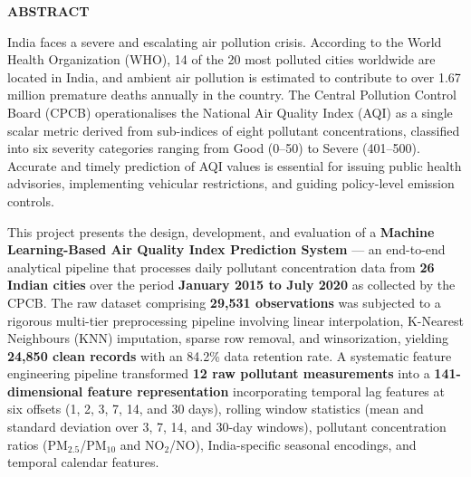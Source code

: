 \documentclass[12pt,a4paper]{report}
\begin{document}
\vspace*{0.5cm}

{\LARGE \textbf{ABSTRACT}}

\vspace{1cm}

India faces a severe and escalating air pollution crisis. According to the World Health Organization (WHO), 14 of the 20 most polluted cities worldwide are located in India, and ambient air pollution is estimated to contribute to over 1.67 million premature deaths annually in the country. The Central Pollution Control Board (CPCB) operationalises the National Air Quality Index (AQI) as a single scalar metric derived from sub-indices of eight pollutant concentrations, classified into six severity categories ranging from Good (0--50) to Severe (401--500). Accurate and timely prediction of AQI values is essential for issuing public health advisories, implementing vehicular restrictions, and guiding policy-level emission controls.

This project presents the design, development, and evaluation of a \textbf{Machine Learning-Based Air Quality Index Prediction System} --- an end-to-end analytical pipeline that processes daily pollutant concentration data from \textbf{26 Indian cities} over the period \textbf{January 2015 to July 2020} as collected by the CPCB. The raw dataset comprising \textbf{29,531 observations} was subjected to a rigorous multi-tier preprocessing pipeline involving linear interpolation, K-Nearest Neighbours (KNN) imputation, sparse row removal, and winsorization, yielding \textbf{24,850 clean records} with an 84.2\% data retention rate. A systematic feature engineering pipeline transformed \textbf{12 raw pollutant measurements} into a \textbf{141-dimensional feature representation} incorporating temporal lag features at six offsets (1, 2, 3, 7, 14, and 30 days), rolling window statistics (mean and standard deviation over 3, 7, 14, and 30-day windows), pollutant concentration ratios (PM$_{2.5}$/PM$_{10}$ and NO$_2$/NO), India-specific seasonal encodings, and temporal calendar features.
\end{document}
